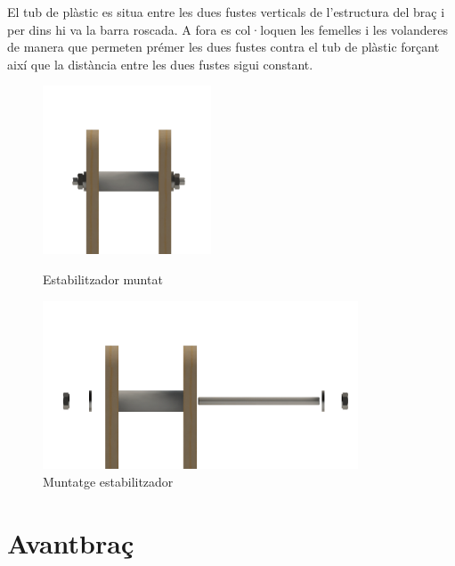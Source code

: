 \documentclass[a4paper, 12pt]{article}
\begin{document}
El tub de plàstic es situa entre les dues fustes verticals de l'estructura del braç i per dins hi va la barra roscada. A fora es col·loquen les femelles i les volanderes de manera que permeten prémer les dues fustes contra el tub de plàstic forçant així que la distància entre les dues fustes sigui constant.

\begin{figure}[h!]
\begin{minipage}[b]{0.45\linewidth}
\centering
\includegraphics[height=5cm]{./imgComp/estab}
\caption{Estabilitzador muntat}
\end{minipage}
\begin{minipage}[b]{0.45\linewidth}
\centering
\includegraphics[height=5cm]{./imgComp/estab_expl}
\caption{Muntatge estabilitzador}
\end{minipage}
\end{figure}

\newpage
\section{Avantbraç}
\end{document}
